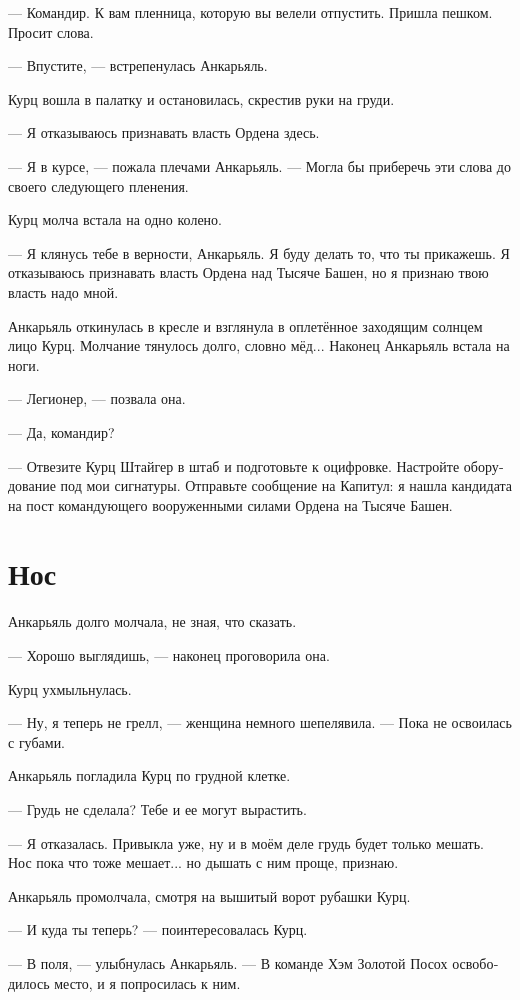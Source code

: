 \documentclass[a4paper,10pt,fleqn]{book}\usepackage{polyglossia}\setdefaultlanguage[babelshorthands=true]{russian}\setotherlanguage{english}\defaultfontfeatures{Ligatures=TeX,Mapping=tex-text}\usepackage{xcolor}\newcommand{\ml}[3]{#2}
\begin{document}
--- Командир.
К вам пленница, которую вы велели отпустить.
Пришла пешком.
Просит слова.

--- Впустите, --- встрепенулась Анкарьяль.

Курц вошла в палатку и остановилась, скрестив руки на груди.

--- Я отказываюсь признавать власть Ордена здесь.

--- Я в курсе, --- пожала плечами Анкарьяль.
--- Могла бы приберечь эти слова до своего следующего пленения.

Курц молча встала на одно колено.

--- Я клянусь тебе в верности, Анкарьяль.
Я буду делать то, что ты прикажешь.
Я отказываюсь признавать власть Ордена над Тысяче Башен, но я признаю твою власть надо мной.

Анкарьяль откинулась в кресле и взглянула в оплетённое заходящим солнцем лицо Курц.
Молчание тянулось долго, словно мёд...
Наконец Анкарьяль встала на ноги.

--- Легионер, --- позвала она.

--- Да, командир?

--- Отвезите Курц Штайгер в штаб и подготовьте к оцифровке.
Настройте оборудование под мои сигнатуры.
Отправьте сообщение на Капитул: я нашла кандидата на пост командующего вооруженными силами Ордена на Тысяче Башен.

\section{Нос}

Анкарьяль долго молчала, не зная, что сказать.

--- Хорошо выглядишь, --- наконец проговорила она.

Курц ухмыльнулась.

--- Ну, я теперь не грелл, --- женщина немного шепелявила.
--- Пока не освоилась с губами.

Анкарьяль погладила Курц по грудной клетке.

--- Грудь не сделала?
Тебе и ее могут вырастить.

--- Я отказалась.
Привыкла уже, ну и в моём деле грудь будет только мешать.
Нос пока что тоже мешает... но дышать с ним проще, признаю.

Анкарьяль промолчала, смотря на вышитый ворот рубашки Курц.

--- И куда ты теперь? --- поинтересовалась Курц.

--- В поля, --- улыбнулась Анкарьяль.
--- В команде Хэм Золотой Посох освободилось место, и я попросилась к ним.
\end{document}
